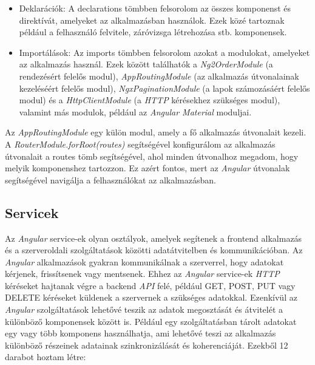 \begin{itemize}

\item{Deklarációk:} A declarations tömbben felsorolom az összes komponenst és direktívát, amelyeket az alkalmazásban használok. Ezek közé tartoznak például a felhasználó felvitele, záróvizsga létrehozása stb. komponensek. 

\item{Importálások:} Az imports tömbben felsorolom azokat a modulokat, amelyeket az alkalmazás használ. Ezek között találhatók a \textit{Ng2OrderModule} (a rendezésért felelős modul), \textit{AppRoutingModule} (az alkalmazás útvonalainak kezeléséért felelős modul), \textit{NgxPaginationModule} (a lapok számozásáért felelős modul) és a \textit{HttpClientModule} (a \textit{HTTP} kérésekhez szükséges modul), valamint más modulok, például az \textit{Angular Material} moduljai.

\end{itemize}

Az \textit{AppRoutingModule} egy külön modul, amely a fő alkalmazás útvonalait kezeli. A \textit{RouterModule.forRoot(routes)} segítségével konfigurálom az alkalmazás útvonalait a routes tömb segítségével, ahol minden útvonalhoz megadom, hogy melyik komponenshez tartozzon. Ez azért fontos, mert az \textit{Angular} útvonalak segítségével navigálja a felhasználókat az alkalmazásban.

\subsection{Servicek}

Az \textit{Angular} service-ek olyan osztályok, amelyek segítenek a frontend alkalmazás és a szerveroldali  szolgáltatások közötti adatátvitelben és kommunikációban. Az \textit{Angular} alkalmazások gyakran kommunikálnak a szerverrel, hogy adatokat kérjenek, frissítsenek vagy mentsenek. Ehhez az \textit{Angular} service-ek \textit{HTTP} kéréseket hajtanak végre a backend \textit{API} felé, például GET, POST, PUT vagy DELETE kéréseket küldenek a szervernek a szükséges adatokkal. Ezenkívül az \textit{Angular} szolgáltatások lehetővé teszik az adatok megosztását és átvitelét a különböző komponensek között is. Például egy szolgáltatásban tárolt adatokat egy vagy több komponens használhatja, ami lehetővé teszi az alkalmazás különböző részeinek adatainak szinkronizálását és koherenciáját. Ezekből 12 darabot hoztam létre:

